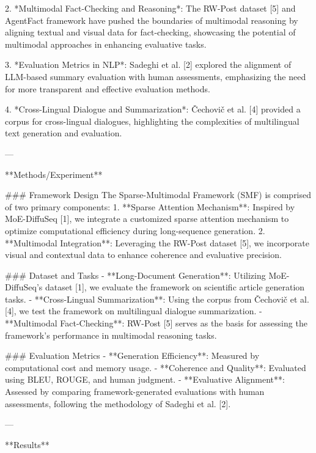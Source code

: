 2. *Multimodal Fact-Checking and Reasoning*: The RW-Post dataset [5] and AgentFact framework have pushed the boundaries of multimodal reasoning by aligning textual and visual data for fact-checking, showcasing the potential of multimodal approaches in enhancing evaluative tasks.

3. *Evaluation Metrics in NLP*: Sadeghi et al. [2] explored the alignment of LLM-based summary evaluation with human assessments, emphasizing the need for more transparent and effective evaluation methods.  

4. *Cross-Lingual Dialogue and Summarization*: Čechovič et al. [4] provided a corpus for cross-lingual dialogues, highlighting the complexities of multilingual text generation and evaluation.  

---

**Methods/Experiment**  

### Framework Design  
The Sparse-Multimodal Framework (SMF) is comprised of two primary components:
1. **Sparse Attention Mechanism**: Inspired by MoE-DiffuSeq [1], we integrate a customized sparse attention mechanism to optimize computational efficiency during long-sequence generation.  
2. **Multimodal Integration**: Leveraging the RW-Post dataset [5], we incorporate visual and contextual data to enhance coherence and evaluative precision.

### Dataset and Tasks  
- **Long-Document Generation**: Utilizing MoE-DiffuSeq's dataset [1], we evaluate the framework on scientific article generation tasks.  
- **Cross-Lingual Summarization**: Using the corpus from Čechovič et al. [4], we test the framework on multilingual dialogue summarization.  
- **Multimodal Fact-Checking**: RW-Post [5] serves as the basis for assessing the framework's performance in multimodal reasoning tasks.

### Evaluation Metrics  
- **Generation Efficiency**: Measured by computational cost and memory usage.
- **Coherence and Quality**: Evaluated using BLEU, ROUGE, and human judgment.
- **Evaluative Alignment**: Assessed by comparing framework-generated evaluations with human assessments, following the methodology of Sadeghi et al. [2].  

---

**Results**  


